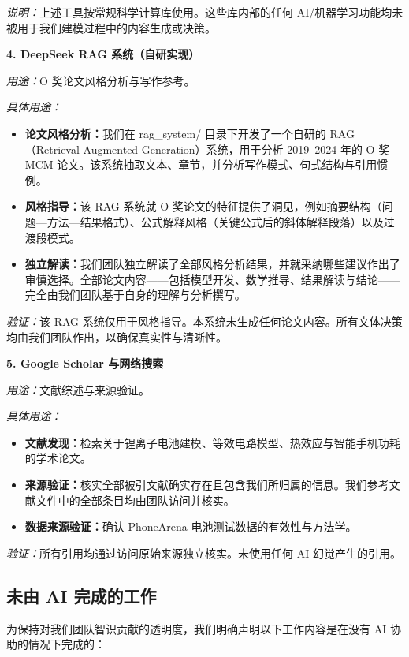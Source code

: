 \documentclass[11pt,a4paper]{ctexart}
\begin{document}
\emph{说明：}上述工具按常规科学计算库使用。这些库内部的任何 AI/机器学习功能均未被用于我们建模过程中的内容生成或决策。

\textbf{4. DeepSeek RAG 系统（自研实现）}

\emph{用途：}O 奖论文风格分析与写作参考。

\emph{具体用途：}
\begin{itemize}[leftmargin=1.8em,itemsep=0.25em]
\item \textbf{论文风格分析：}我们在 rag\_system/ 目录下开发了一个自研的 RAG（Retrieval-Augmented Generation）系统，用于分析 2019--2024 年的 O 奖 MCM 论文。该系统抽取文本、章节，并分析写作模式、句式结构与引用惯例。
\item \textbf{风格指导：}该 RAG 系统就 O 奖论文的特征提供了洞见，例如摘要结构（问题—方法—结果格式）、公式解释风格（关键公式后的斜体解释段落）以及过渡段模式。
\item \textbf{独立解读：}我们团队独立解读了全部风格分析结果，并就采纳哪些建议作出了审慎选择。全部论文内容——包括模型开发、数学推导、结果解读与结论——完全由我们团队基于自身的理解与分析撰写。
\end{itemize}

\emph{验证：}该 RAG 系统仅用于风格指导。本系统未生成任何论文内容。所有文体决策均由我们团队作出，以确保真实性与清晰性。

\textbf{5. Google Scholar 与网络搜索}

\emph{用途：}文献综述与来源验证。

\emph{具体用途：}
\begin{itemize}[leftmargin=1.8em,itemsep=0.25em]
\item \textbf{文献发现：}检索关于锂离子电池建模、等效电路模型、热效应与智能手机功耗的学术论文。
\item \textbf{来源验证：}核实全部被引文献确实存在且包含我们所归属的信息。我们参考文献文件中的全部条目均由团队访问并核实。
\item \textbf{数据来源验证：}确认 PhoneArena 电池测试数据的有效性与方法学。
\end{itemize}

\emph{验证：}所有引用均通过访问原始来源独立核实。未使用任何 AI 幻觉产生的引用。

\subsection*{未由 AI 完成的工作}

为保持对我们团队智识贡献的透明度，我们明确声明以下工作内容是在没有 AI 协助的情况下完成的：
\end{document}
